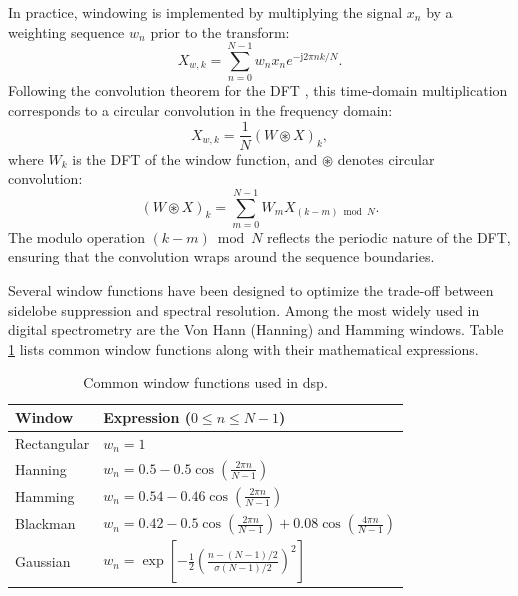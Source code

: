 In practice, windowing is implemented by multiplying the signal $x_n$ by a weighting sequence $w_n$ prior to the transform:
\begin{equation}
    X_{w,k} = \sum_{n=0}^{N-1} w_n x_n e^{-\mathrm{j} 2\pi n k / N}.
\end{equation}
Following the convolution theorem for the DFT \citep[see][Chapter~8]{OppenheimSchafer2010}, this time-domain multiplication corresponds to a circular convolution in the frequency domain:
\begin{equation}    
    X_{w,k} = \frac{1}{N} (W \circledast X)_k,
\end{equation}
where $W_k$ is the DFT of the window function, and $\circledast$ denotes circular convolution:
\begin{equation}
    (W \circledast X)_k = \sum_{m=0}^{N-1} W_m X_{(k - m) \bmod N}.
\end{equation}
The modulo operation $(k - m) \bmod N$ reflects the periodic nature of the DFT, ensuring that the convolution wraps around the sequence boundaries.

Several window functions have been designed to optimize the trade-off between sidelobe suppression and spectral resolution. Among the most widely used in digital spectrometry are the Von Hann (Hanning) and Hamming windows. Table \ref{tab:window_functions} lists common window functions along with their mathematical expressions.

\begin{table}[t]
    \centering
    \caption{Common window functions used in \gls{dsp}.}
    \begin{tabular}{ll}
        \toprule
        \textbf{Window} & \textbf{Expression ($0 \le n \le N-1$)} \\
        \midrule
        Rectangular & $w_n = 1$ \\
        Hanning & $w_n = 0.5 - 0.5 \cos\left(\frac{2\pi n}{N-1}\right)$ \\
        Hamming & $w_n = 0.54 - 0.46 \cos\left(\frac{2\pi n}{N-1}\right)$ \\
        Blackman & $w_n = 0.42 - 0.5 \cos\left(\frac{2\pi n}{N-1}\right) + 0.08 \cos\left(\frac{4\pi n}{N-1}\right)$ \\
        Gaussian & $w_n = \exp\left[{-\frac{1}{2} \left(\frac{n - (N-1)/2}{\sigma (N-1)/2}\right)^2}\right]$ \\
        \bottomrule
    \end{tabular}
    \label{tab:window_functions}
\end{table}



